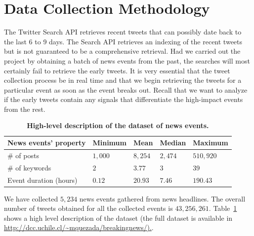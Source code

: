 \documentclass[10pt,letterpaper]{article}
\date{}
\begin{document}
\vspace*{0.35in}

{\Large
\textbf{}
}

\section{Data Collection Methodology}
\label{sec:data_collection_methodology}
The Twitter Search
API \cite{Twitter_API}
retrieves recent tweets that can possibly date back to the last 6
to 9 days.  The Search API retrieves an indexing of the recent tweets
but is not guaranteed to be a comprehensive retrieval. Had we
carried out the project by obtaining a batch of news events from the
past, the searches will most certainly fail to retrieve the early
tweets.  It is very essential that the tweet collection process be in real
time and that we begin retrieving the
tweets for a particular event as soon as the event breaks out.  Recall that we
want to analyze if the early tweets contain any signals that
differentiate the high-impact events from the rest. 


\begin{table}[h]
  \centering
  \begin{tabular}{@{}lllll@{}}
    \toprule
    \textbf{News events' property} & \textbf{Minimum} & \textbf{Mean} & \textbf{Median} & \textbf{Maximum} \\ \midrule
    \# of posts & $1,000$ & $8,254$ & $2,474$ & $510,920$ \\
    \# of keywords & $2$ & $3.77$ & $3$ & $39$ \\ 
    Event duration (hours) & $0.12$ & $20.93$ & $7.46$ & $190.43$ \\ \bottomrule
  \end{tabular}
  \caption{\bf High-level description of the dataset of news events.} \label{table:dataset-stats}

\end{table}

We have collected $5,234$ news events gathered from news headlines.
The overall number of tweets obtained for all the collected events is
$43,256,261$. Table~\ref{table:dataset-stats} shows a high level
description of the dataset (the full
  dataset is available in
  \url{http://dcc.uchile.cl/~mquezada/breakingnews/).}.
\end{document}
